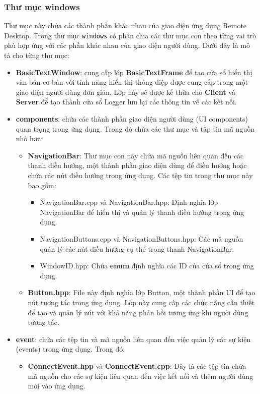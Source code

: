 \subsubsection{Thư mục windows}
Thư mục này chứa các thành phần khác nhau của giao diện ứng dụng Remote Desktop. Trong thư mục \verb|windows| có phân chia các thư mục con theo từng vai trò phù hợp ứng với các phần khác nhau của giao diện người dùng. Dưới đây là mô tả cho từng thư mục:
\begin{itemize}
	\item \textbf{BasicTextWindow}: cung cấp lớp \textbf{BasicTextFrame} để tạo cửa sổ hiển thị văn bản cơ bản với tính năng hiển thị thông điệp được cung cấp trong một giao diện người dùng đơn giản. Lớp này sẽ được kế thừa cho \textbf{Client} và \textbf{Server} để tạo thành cửa sổ Logger lưu lại các thông tin về các kết nối.
	\item \textbf{components}: chứa các thành phần giao diện người dùng (UI components) quan trọng trong ứng dụng. Trong đó chứa các thư mục và tập tin mã nguồn nhỏ hơn:
	\begin{itemize}
		\item \textbf{NavigationBar}: Thư mục con này chứa mã nguồn liên quan đến các thanh điều hướng, một thành phần giao diện dùng để điều hướng hoặc chứa các nút điều hướng trong ứng dụng. Các tệp tin trong thư mục này bao gồm:
		\begin{itemize}
			\item NavigationBar.cpp và NavigationBar.hpp: Định nghĩa lớp NavigationBar để hiển thị và quản lý thanh điều hướng trong ứng dụng.
			\item NavigationButtons.cpp và NavigationButtons.hpp: Các mã nguồn quản lý các nút điều hướng cụ thể trong thanh NavigationBar.
			\item WindowID.hpp: Chứa \textbf{enum} định nghĩa các ID của cửa sổ trong ứng dụng.
		\end{itemize}
		\item \textbf{Button.hpp}: File này định nghĩa lớp Button, một thành phần UI để tạo nút tương tác trong ứng dụng. Lớp này cung cấp các chức năng cần thiết để tạo và quản lý nút với khả năng phản hồi tương ứng khi người dùng tương tác.
	\end{itemize}
	\item \textbf{event}: chứa các tệp tin và mã nguồn liên quan đến việc quản lý các sự kiện (events) trong ứng dụng. Trong đó:
	\begin{itemize}
		\item \textbf{ConnectEvent.hpp} và \textbf{ConnectEvent.cpp}: Đây là các tệp tin chứa mã nguồn cho các sự kiện liên quan đến việc kết nối và thêm người dùng mới vào ứng dụng.

\end{itemize}
\end{itemize}
